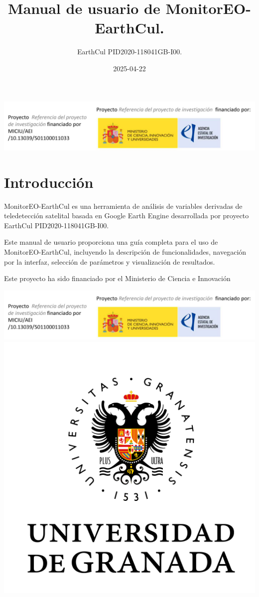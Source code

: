 \documentclass[
]{book}
\title{Manual de usuario de MonitorEO-EarthCul.}
\author{EarthCul PID2020-118041GB-I00.}
\date{2025-04-22}
\begin{document}
\maketitle

{
\setcounter{tocdepth}{1}
\tableofcontents
}
\includegraphics{assets/logo.jpeg}

\chapter{Introducción}\label{intro}

MonitorEO-EarthCul es una herramienta de análisis de variables derivadas de teledetección satelital basada en Google Earth Engine desarrollada por proyecto EarthCul PID2020-118041GB-I00.

Este manual de usuario proporciona una guía completa para el uso de MonitorEO-EarthCul, incluyendo la descripción de funcionalidades, navegación por la interfaz, selección de parámetros y visualización de resultados.

Este proyecto ha sido financiado por el Ministerio de Ciencia e Innovación

\includegraphics{assets/logo.jpeg}
\includegraphics{assets/logo-ugr.png}
\end{document}
